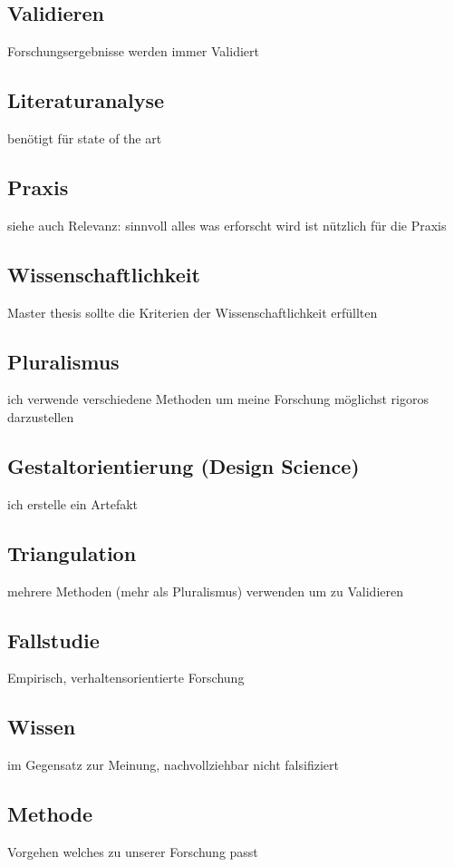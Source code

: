 \documentclass[DIV=calc, paper=a4, fontsize=11pt, twocolumn]{scrartcl}	 %
\begin{document}
\subsection*{Validieren}
Forschungsergebnisse werden immer Validiert

\subsection*{Literaturanalyse}
ben\"otigt f\"ur state of the art

\subsection*{Praxis}
siehe auch Relevanz: sinnvoll alles was erforscht wird ist n\"utzlich f\"ur die Praxis

\subsection*{Wissenschaftlichkeit}
Master thesis sollte die Kriterien der Wissenschaftlichkeit erf\"ullten

\subsection*{Pluralismus}
ich verwende verschiedene Methoden um meine Forschung m\"oglichst rigoros darzustellen

\subsection*{Gestaltorientierung (Design Science)}
ich erstelle ein Artefakt

\subsection*{Triangulation}
mehrere Methoden (mehr als Pluralismus) verwenden um zu Validieren

\subsection*{Fallstudie}
Empirisch, verhaltensorientierte Forschung

\subsection*{Wissen}
im Gegensatz zur Meinung, nachvollziehbar nicht falsifiziert

\subsection*{Methode}
Vorgehen welches zu unserer Forschung passt
\end{document}
